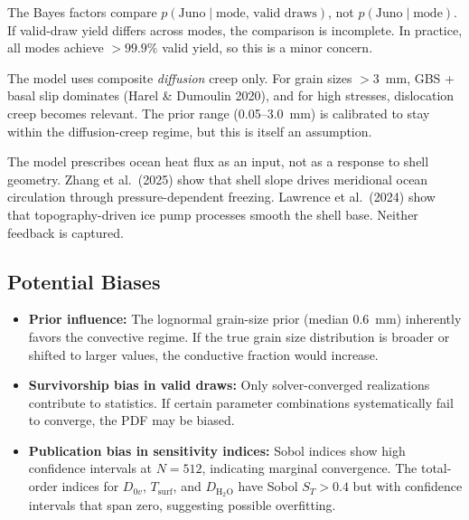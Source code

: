 \documentclass[11pt,letterpaper]{article}
\begin{document}
\begin{critiquebox}
The Bayes factors compare $p(\mathrm{Juno} \mid \text{mode, valid draws})$, not $p(\mathrm{Juno} \mid \text{mode})$. If valid-draw yield differs across modes, the comparison is incomplete. In practice, all modes achieve $> 99.9\%$ valid yield, so this is a minor concern.
\end{critiquebox}

\begin{critiquebox}
The model uses composite \textit{diffusion} creep only. For grain sizes $> 3$~mm, GBS + basal slip dominates (Harel \& Dumoulin 2020), and for high stresses, dislocation creep becomes relevant. The prior range (0.05--3.0~mm) is calibrated to stay within the diffusion-creep regime, but this is itself an assumption.
\end{critiquebox}

\begin{critiquebox}
The model prescribes ocean heat flux as an input, not as a response to shell geometry. Zhang et al.\ (2025) show that shell slope drives meridional ocean circulation through pressure-dependent freezing. Lawrence et al.\ (2024) show that topography-driven ice pump processes smooth the shell base. Neither feedback is captured.
\end{critiquebox}

\subsection{Potential Biases}

\begin{itemize}[nosep]
  \item \textbf{Prior influence:} The lognormal grain-size prior (median 0.6~mm) inherently favors the convective regime. If the true grain size distribution is broader or shifted to larger values, the conductive fraction would increase.
  \item \textbf{Survivorship bias in valid draws:} Only solver-converged realizations contribute to statistics. If certain parameter combinations systematically fail to converge, the PDF may be biased.
  \item \textbf{Publication bias in sensitivity indices:} Sobol indices show high confidence intervals at $N = 512$, indicating marginal convergence. The total-order indices for $D_{0v}$, $T_\mathrm{surf}$, and $D_\mathrm{H_2O}$ have Sobol $S_T > 0.4$ but with confidence intervals that span zero, suggesting possible overfitting.
\end{itemize}
\end{document}
